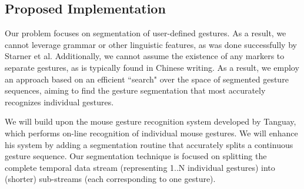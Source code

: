 \documentclass[twoside]{article}
\begin{document}
\begin{multicols}{2}
\section{Proposed Implementation}

Our problem focuses on segmentation of user-defined gestures. As a result, we
cannot leverage grammar or other linguistic features, as was done successfully
by Starner et al\cite{starner1994line}. Additionally, we cannot
assume the existence of any markers to separate gestures, as is typically found in Chinese
writing\cite{hong1998segmentation}. As a result, we employ an approach based on
an efficient ``search" over the space of segmented gesture sequences, aiming to
find the gesture segmentation that most accurately recognizes individual
gestures.

We will build upon the mouse gesture recognition system developed by
Tanguay\cite{tanguay_jr_hidden_1995}, which performs on-line recognition of
individual mouse gestures. We will enhance his system by adding a segmentation
routine that accurately splits a continuous gesture sequence. Our segmentation
technique is focused on splitting the complete temporal data stream
(representing 1..N individual gestures) into (shorter) sub-streams (each
corresponding to one gesture).


\end{multicols}
\end{document}
